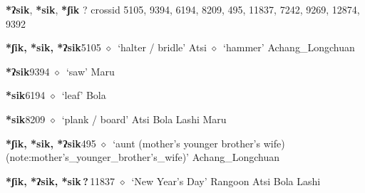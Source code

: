 \item
\textbf{*ʔsik}, \textbf{*sik}, \textbf{*ʃik}
?
  {\tiny crossid 5105, 9394, 6194, 8209, 495, 11837, 7242, 9269, 12874, 9392}
  \begin{list}{}{\leftmargin=1.5em \itemindent=-1.5em}
  \item {\footnotesize \textbf{*ʃik, *sik, *ʔsik}}{\tiny 5105}
         $\diamond$~`halter / bridle'
         Atsi 
\hspace{1ex}
         $\diamond$~`hammer'
         Achang\_Longchuan 
  \item {\footnotesize \textbf{*ʔsik}}{\tiny 9394}
\hspace{1ex}
         $\diamond$~`saw'
         Maru 
  \item {\footnotesize \textbf{*sik}}{\tiny 6194}
\hspace{1ex}
         $\diamond$~`leaf'
         Bola 
  \item {\footnotesize \textbf{*sik}}{\tiny 8209}
\hspace{1ex}
         $\diamond$~`plank / board'
         Atsi 
\hspace{1ex}
         Bola 
\hspace{1ex}
         Lashi 
\hspace{1ex}
         Maru 
  \item {\footnotesize \textbf{*ʃik, *sik, *ʔsik}}{\tiny 495}
\hspace{1ex}
         $\diamond$~`aunt (mother's younger brother's wife) (note:mother's_younger_brother's_wife)'
         Achang\_Longchuan 
  \item {\footnotesize \textbf{*ʃik, *ʔsik, *sik\,?\,}}{\tiny 11837}
\hspace{1ex}
         $\diamond$~`New Year's Day'
         Rangoon 
\hspace{1ex}
         Atsi 
\hspace{1ex}
         Bola 
\hspace{1ex}
         Lashi 
\hspace{1ex}

\end{list}
